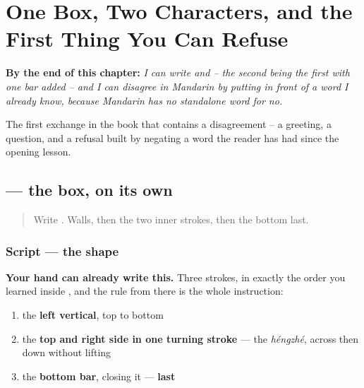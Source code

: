 
\chapter{One Box, Two Characters, and the First Thing You Can Refuse}
\label{ch:zh-negation}

\begin{chapteropening}
\textbf{By the end of this chapter:} \emph{I can write  and  -- the second being the first with one bar added -- and I can disagree in Mandarin by putting  in front of a word I already know, because Mandarin has no standalone word for no.}

The first exchange in the book that contains a disagreement -- a greeting, a question, and a refusal built by negating a word the reader has had since the opening lesson.
\end{chapteropening}

\section[\texorpdfstring{\zh{口} (kǒu)}{口 (kǒu)}]{ — the box, on its own}

\label{lesson:ZH-W04-kou}



\begin{quote}
Write . Walls, then the two inner strokes, then the bottom last.
\end{quote}

\subsection*{Script — the shape}

\begin{quote}
\end{quote}

\textbf{Your hand can already write this.} Three strokes, in exactly the order you learned inside , and the rule from there is the whole instruction:

\begin{enumerate}
\raggedright
  \item the \textbf{left vertical}, top to bottom
  \item the \textbf{top and right side in one turning stroke} — the \emph{héngzhé}, across then down without lifting
  \item the \textbf{bottom bar}, closing it — \textbf{last}
\end{enumerate}

